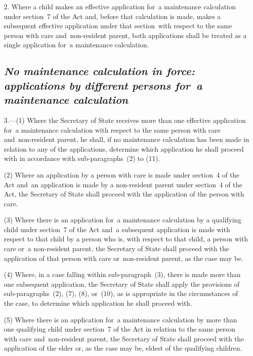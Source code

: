 \documentclass[12pt,a4paper]{article}
\begin{document}
2.  Where a child makes an effective application for~a maintenance calculation under section~7 of the Act and, before that calculation is made, makes a subsequent effective application under that section~with respect to the same person with care and~non-resident parent, both applications shall be treated as a single application for~a maintenance calculation.

\subsection*{\itshape No maintenance calculation in force: applications by different persons for~a maintenance calculation}

3.---(1)  Where the Secretary of State receives more than one effective application for~a maintenance calculation with respect to the same person with care and~non-resident parent, he shall, if no maintenance calculation has been made in relation to any of the applications, determine which application he shall proceed with in accordance with sub-paragraphs~(2) to (11).

(2) Where an application by a person with care is made under section~4 of the Act 
and~an application is made by a non-resident parent under section~4 of the Act, the Secretary of State shall proceed with the application of the person with care.

(3) Where there is an application for~a maintenance calculation by a qualifying child under section~7 of the Act and~a subsequent application is made with respect to that child by a person who is, with respect to that child, a person with care or~a non-resident parent, the Secretary of State shall proceed with the application of that person with care or~non-resident parent, as the case may be.

(4) Where, in a case falling within sub-paragraph~(3), there is made more than one subsequent application, the Secretary of State shall apply the provisions of sub-paragraphs~(2), (7), (8), or~(10), as is appropriate in the circumstances of the case, to determine which application he shall proceed with.

(5) Where there is an application for~a maintenance calculation by more than one qualifying child under section~7 of the Act in relation to the same person with care and~non-resident parent, the Secretary of State shall proceed with the application of the elder or, as the case may be, eldest of the qualifying children.
\end{document}
